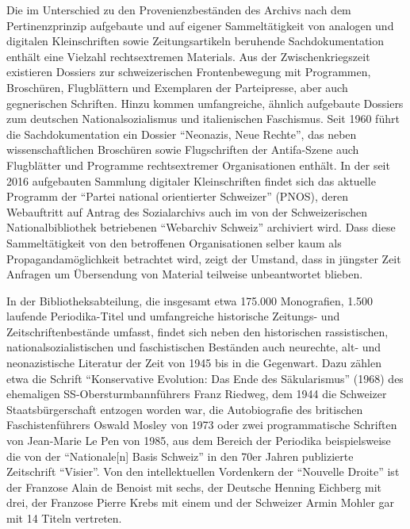 \documentclass[a4paper,
fontsize=11pt,
oneside,
numbers=noperiodatend,
parskip=half-,
bibliography=totoc,
final
]{scrartcl}
\begin{document}
Die im Unterschied zu den Provenienzbeständen des Archivs nach dem
Pertinenzprinzip aufgebaute und auf eigener Sammeltätigkeit von analogen
und digitalen Kleinschriften sowie Zeitungsartikeln beruhende
Sachdokumentation enthält eine Vielzahl rechtsextremen Materials. Aus
der Zwischenkriegszeit existieren Dossiers zur schweizerischen
Frontenbewegung mit Programmen, Broschüren, Flugblättern und Exemplaren
der Parteipresse, aber auch gegnerischen Schriften. Hinzu kommen
umfangreiche, ähnlich aufgebaute Dossiers zum deutschen
Nationalsozialismus und italienischen Faschismus. Seit 1960 führt die
Sachdokumentation ein Dossier \enquote{Neonazis, Neue Rechte}, das neben
wissenschaftlichen Broschüren sowie Flugschriften der Antifa-Szene auch
Flugblätter und Programme rechtsextremer Organisationen enthält. In der
seit 2016 aufgebauten Sammlung digitaler Kleinschriften findet sich das
aktuelle Programm der \enquote{Partei national orientierter Schweizer}
(PNOS), deren Webauftritt auf Antrag des Sozialarchivs auch im von der
Schweizerischen Nationalbibliothek betriebenen \enquote{Webarchiv
Schweiz} archiviert wird. Dass diese Sammeltätigkeit von den betroffenen
Organisationen selber kaum als Propagandamöglichkeit betrachtet wird,
zeigt der Umstand, dass in jüngster Zeit Anfragen um Übersendung von
Material teilweise unbeantwortet blieben.

In der Bibliotheksabteilung, die insgesamt etwa 175.000 Monografien,
1.500 laufende Periodika-Titel und umfangreiche historische Zeitungs-
und Zeitschriftenbestände umfasst, findet sich neben den historischen
rassistischen, nationalsozialistischen und faschistischen Beständen auch
neurechte, alt- und neonazistische Literatur der Zeit von 1945 bis in
die Gegenwart. Dazu zählen etwa die Schrift \enquote{Konservative
Evolution: Das Ende des Säkularismus} (1968) des ehemaligen
SS-Obersturmbannführers Franz Riedweg, dem 1944 die Schweizer
Staatsbürgerschaft entzogen worden war, die Autobiografie des britischen
Faschistenführers Oswald Mosley von 1973 oder zwei programmatische
Schriften von Jean-Marie Le Pen von 1985, aus dem Bereich der Periodika
beispielsweise die von der \enquote{Nationale{[}n{]} Basis Schweiz} in
den 70er Jahren publizierte Zeitschrift \enquote{Visier}. Von den
intellektuellen Vordenkern der \enquote{Nouvelle Droite} ist der
Franzose Alain de Benoist mit sechs, der Deutsche Henning Eichberg mit
drei, der Franzose Pierre Krebs mit einem und der Schweizer Armin Mohler
gar mit 14 Titeln vertreten.
\end{document}
